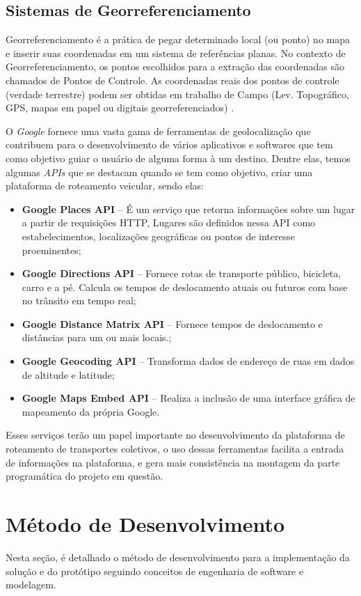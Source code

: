 \subsection{Sistemas de Georreferenciamento}\label{georreferenciamento}

Georreferenciamento é a prática de pegar determinado local (ou ponto) no mapa e inserir suas coordenadas em um sistema de referências planas. No contexto de Georreferenciamento, os pontos escolhidos para a extração das coordenadas são chamados de Pontos de Controle. As coordenadas reais dos pontos de controle (verdade terrestre) podem ser obtidas em trabalho de Campo (Lev. Topográfico, GPS, mapas em papel ou digitais georreferenciados) \cite{georreferenciamento}.

O \emph{Google} fornece uma vasta gama de ferramentas de geolocalização que contribuem para o desenvolvimento de vários aplicativos e softwares que tem como objetivo guiar o usuário de alguma forma à um destino. Dentre elas, temos algumas \emph{APIs} que se destacam quando se tem como objetivo, criar uma plataforma de roteamento veicular, sendo elas:
\begin{itemize}
    \item \textbf{Google Places API} -- É um serviço que retorna informações sobre um lugar a partir de requisições HTTP, Lugares são definidos nessa API como estabelecimentos, localizações geográficas ou pontos de interesse proeminentes;
    \item \textbf{Google Directions API} -- Fornece rotas de transporte público, bicicleta, carro e a pé. Calcula os tempos de deslocamento atuais ou futuros com base no trânsito em tempo real;
    \item \textbf{Google Distance Matrix API} -- Fornece tempos de deslocamento e distâncias para um ou mais locais.;
    \item \textbf{Google Geocoding API} -- Transforma dados de endereço de ruas em dados de altitude e latitude;
    \item \textbf{Google Maps Embed API} -- Realiza a inclusão de uma interface gráfica de mapeamento da própria Google.
\end{itemize}

Esses serviços terão um papel importante no desenvolvimento da plataforma de roteamento de transportes coletivos, o uso dessas ferramentas facilita a entrada de informações na plataforma, e gera mais consistência na montagem da parte programática do projeto em questão.


\section{Método de Desenvolvimento}
\label{metodo-desenvolvimento}
Nesta seção, é detalhado o método de desenvolvimento para a implementação da solução e do protótipo seguindo conceitos de engenharia de software e modelagem.

